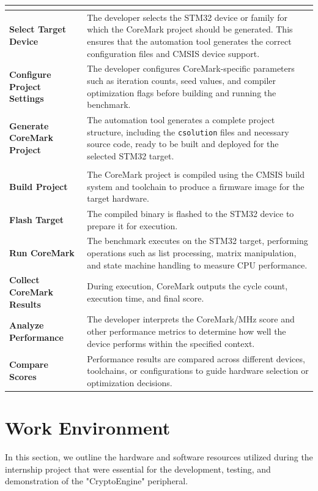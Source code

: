 \begin{xltabular}{\linewidth}{@{}>{\bfseries}l X@{}}
	 \\
	\midrule
	Select Target Device &
	The developer selects the STM32 device or family for which the CoreMark project should be generated. 
	This ensures that the automation tool generates the correct configuration files and CMSIS device support. \\
	\midrule
	Configure Project Settings &
	The developer configures CoreMark-specific parameters such as iteration counts, seed values, and compiler optimization flags 
	before building and running the benchmark. \\
	\midrule
	Generate CoreMark Project &
	The automation tool generates a complete project structure, including the \texttt{csolution} files and necessary source code, 
	ready to be built and deployed for the selected STM32 target. \\
	\midrule
	 \\
	\midrule
	Build Project &
	The CoreMark project is compiled using the CMSIS build system and toolchain to produce a firmware image for the target hardware. \\
	\midrule
	Flash Target &
	The compiled binary is flashed to the STM32 device to prepare it for execution.\\
	\midrule
	Run CoreMark &
	The benchmark executes on the STM32 target, performing operations such as list processing, matrix manipulation, and state machine handling 
	to measure CPU performance. \\
	\midrule
	Collect CoreMark Results &
	During execution, CoreMark outputs the cycle count, execution time, and final score. \\
	\midrule
	Analyze Performance &
	The developer interprets the CoreMark/MHz score and other performance metrics to determine how well the device performs within the specified context. \\
	\midrule
	Compare Scores &
	Performance results are compared across different devices, toolchains, or configurations to guide hardware selection or optimization decisions.
\end{xltabular}

\section{Work Environment}
In this section, we outline the hardware and software resources utilized during the internship project that were essential for the development, testing, and demonstration of the "CryptoEngine" peripheral.

